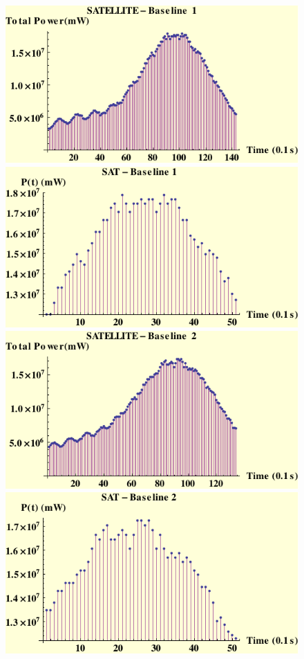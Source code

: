  \begin{figure}[htb]
\begin{center}
 \includegraphics[scale=0.7]{plots/sat1pow.pdf}
 \includegraphics[scale=0.7]{plots/sat1powc.pdf}
 \includegraphics[scale=0.7]{plots/sat2pow.pdf}
 \includegraphics[scale=0.7]{plots/sat2powc.pdf}

\end{center}
\end{figure}

